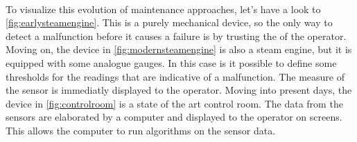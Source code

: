 \paragraph*{}
To visualize this evolution of maintenance approaches, let's have a look to \autoref{fig:earlysteamengine}. This is a purely mechanical device, so the only way to detect a malfunction before it causes a failure is by trusting the  of the operator. Moving on, the device in \autoref{fig:modernsteamengine} is also a steam engine, but it is equipped with some analogue gauges. In this case is it possible to define some thresholds for the readings that are indicative of a malfunction. The measure of the sensor is immediatly displayed to the operator. Moving into present days, the device in \autoref{fig:controlroom} is a state of the art control room. The data from the sensors are elaborated by a computer and displayed to the operator on screens. This allows the computer to run algorithms on the sensor data.


